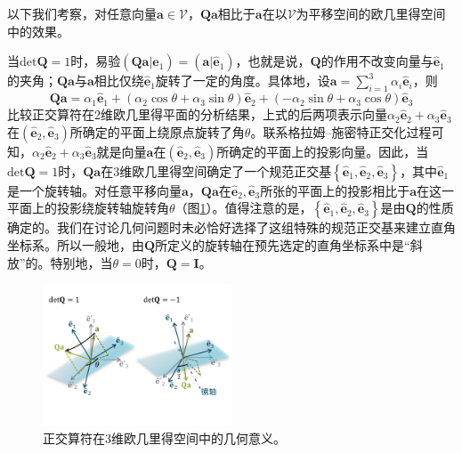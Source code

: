 \documentclass[main.tex]{subfiles}
\begin{document}
以下我们考察，对任意向量$\mathbf{a}\in\mathcal{V}$，$\mathbf{Qa}$相比于$\mathbf{a}$在以$\mathcal{V}$为平移空间的欧几里得空间中的效果。

当$\mathrm{det}\mathbf{Q}=1$时，易验$\left(\mathbf{Qa}|\mathbf{\hat{e}}_1\right)=\left(\mathbf{a}|\mathbf{\hat{e}}_1\right)$，也就是说，$\mathbf{Q}$的作用不改变向量与$\mathbf{\hat{e}}_1$的夹角；$\mathbf{Qa}$与$\mathbf{a}$相比仅绕$\mathbf{\hat{e}}_1$旋转了一定的角度。具体地，设$\mathbf{a}=\sum_{i=1}^3\alpha_i\mathbf{\hat{e}}_i$，则
\[\mathbf{Qa}=\alpha_1\mathbf{\hat{e}}_1+\left(\alpha_2\cos\theta+\alpha_3\sin\theta\right)\mathbf{\hat{e}}_2+\left(-\alpha_2\sin\theta+\alpha_3\cos\theta\right)\mathbf{\hat{e}}_3\]
比较正交算符在2维欧几里得平面的分析结果，上式的后两项表示向量$\alpha_2\mathbf{\hat{e}}_2+\alpha_3\mathbf{\hat{e}}_3$在$\left(\mathbf{\hat{e}}_2,\mathbf{\hat{e}}_3\right)$所确定的平面上绕原点旋转了角$\theta$。联系格拉姆--施密特正交化过程可知，$\alpha_2\mathbf{\hat{e}}_2+\alpha_3\mathbf{\hat{e}}_3$就是向量$\mathbf{a}$在$\left(\mathbf{\hat{e}}_2,\mathbf{\hat{e}}_3\right)$所确定的平面上的投影向量。因此，当$\mathrm{det}\mathbf{Q}=1$时，$\mathbf{Qa}$在3维欧几里得空间确定了一个规范正交基$\left\{\mathbf{\hat{e}}_1,\mathbf{\hat{e}}_2,\mathbf{\hat{e}}_3\right\}$，其中$\mathbf{\hat{e}}_1$是一个旋转轴。对任意平移向量$\mathbf{a}$，$\mathbf{Qa}$在$\mathbf{\hat{e}}_2,\mathbf{\hat{e}}_3$所张的平面上的投影相比于$\mathbf{a}$在这一平面上的投影绕旋转轴旋转角$\theta$（图\ref{fig:II.3.2}）。值得注意的是，$\left\{\mathbf{\hat{e}}_1,\mathbf{\hat{e}}_2,\mathbf{\hat{e}}_3\right\}$是由$\mathbf{Q}$的性质确定的。我们在讨论几何问题时未必恰好选择了这组特殊的规范正交基来建立直角坐标系。所以一般地，由$\mathbf{Q}$所定义的旋转轴在预先选定的直角坐标系中是“斜放”的。特别地，当$\theta=0$时，$\mathbf{Q}=\mathbf{I}$。

\begin{figure}[h]
    \centering
    \includegraphics[width=0.5\textwidth]{images/II.3.2.pdf}
    \caption{正交算符在3维欧几里得空间中的几何意义。}
    \label{fig:II.3.2}
\end{figure}
\end{document}
